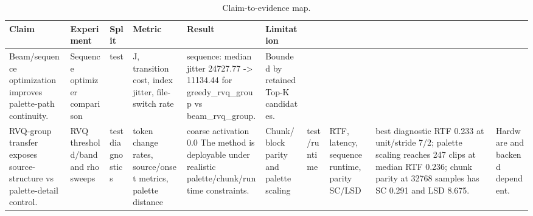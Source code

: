 \begin{table}[t]
\centering
\scriptsize
\setlength{\tabcolsep}{3pt}
\begin{tabular}{p{}p{}p{}p{}p{}p{}}
\toprule
Claim & Experiment & Split & Metric & Result & Limitation \\
\midrule
Beam/sequence optimization improves palette-path continuity. & Sequence optimizer comparison & test & J, transition cost, index jitter, file-switch rate & sequence: median jitter 24727.77 -> 11134.44 for greedy\_rvq\_group vs beam\_rvq\_group. & Bounded by retained Top-K candidates. \\
RVQ-group transfer exposes source-structure vs palette-detail control. & RVQ threshold/band and rho sweeps & test diagnostics & token change rates, source/onset metrics, palette distance & coarse activation 0.0%
The method is deployable under realistic palette/chunk/runtime constraints. & Chunk/block parity and palette scaling & test/runtime & RTF, latency, sequence runtime, parity SC/LSD & best diagnostic RTF 0.233 at unit/stride 7/2; palette scaling reaches 247 clips at median RTF 0.236; chunk parity at 32768 samples has SC 0.291 and LSD 8.675. & Hardware and backend dependent. \\
\bottomrule
\end{tabular}
\caption{Claim-to-evidence map.}
\label{tab:claim-evidence}
\end{table}